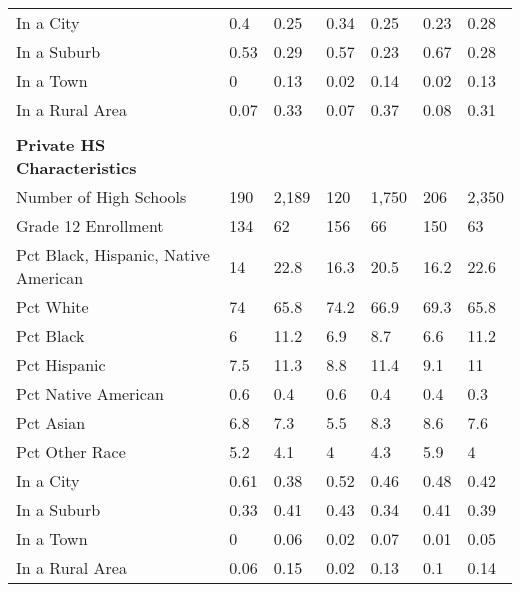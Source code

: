\begin{longtabu}{X[4.5,l] X[1,c] X[1,c] X[1,c] X[1,c] X[1,c] X[1,c]}
\hspace{0.4cm}In a City&0.4&0.25&0.34&0.25&0.23&0.28\\%
\hspace{0.4cm}In a Suburb&0.53&0.29&0.57&0.23&0.67&0.28\\%
\hspace{0.4cm}In a Town&0&0.13&0.02&0.14&0.02&0.13\\%
\hspace{0.4cm}In a Rural Area&0.07&0.33&0.07&0.37&0.08&0.31\\%
&&&&&&\\%
\textbf{Private HS Characteristics}&\textbf{}&\textbf{}&\textbf{}&\textbf{}&\textbf{}&\textbf{}\\%
\hspace{0.4cm}Number of High Schools&190&2,189&120&1,750&206&2,350\\%
\hspace{0.4cm}Grade 12 Enrollment&134&62&156&66&150&63\\%
\hspace{0.4cm}Pct Black, Hispanic, Native American&14&22.8&16.3&20.5&16.2&22.6\\%
\hspace{0.4cm}Pct White&74&65.8&74.2&66.9&69.3&65.8\\%
\hspace{0.4cm}Pct Black&6&11.2&6.9&8.7&6.6&11.2\\%
\hspace{0.4cm}Pct Hispanic&7.5&11.3&8.8&11.4&9.1&11\\%
\hspace{0.4cm}Pct Native American&0.6&0.4&0.6&0.4&0.4&0.3\\%
\hspace{0.4cm}Pct Asian&6.8&7.3&5.5&8.3&8.6&7.6\\%
\hspace{0.4cm}Pct Other Race&5.2&4.1&4&4.3&5.9&4\\%
\hspace{0.4cm}In a City&0.61&0.38&0.52&0.46&0.48&0.42\\%
\hspace{0.4cm}In a Suburb&0.33&0.41&0.43&0.34&0.41&0.39\\%
\hspace{0.4cm}In a Town&0&0.06&0.02&0.07&0.01&0.05\\%
\hspace{0.4cm}In a Rural Area&0.06&0.15&0.02&0.13&0.1&0.14\\%
\end{longtabu}
